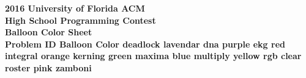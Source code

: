 \documentclass[a4paper,11pt]{article}
\begin{document}
\begin{center}
\vspace{+5mm}
\bf
{\Huge 2016 University of Florida ACM}\vspace{2 mm} \\	
{\huge High School Programming Contest}\vspace{2 mm} \\
{\huge Balloon Color Sheet}\vspace{2 mm} \\
\bf{
\vspace{15mm}
\Huge{
Problem ID \hspace{+51mm} Balloon Color
\newline
\newline
\newline
}
\LARGE{
deadlock \dotfill lavendar
\newline
\newline
\newline
dna \dotfill purple
\newline
\newline
\newline
ekg \dotfill red
\newline
\newline
\newline
integral \dotfill orange
\newline
\newline
\newline
kerning \dotfill green
\newline
\newline
\newline
maxima \dotfill blue
\newline
\newline
\newline
multiply \dotfill yellow
\newline
\newline
\newline
rgb \dotfill clear
\newline
\newline
\newline
roster \dotfill pink
\newline
\newline
\newline
zamboni 
}
}
\end{center}
\end{document}
